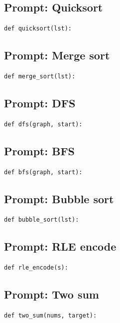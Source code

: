
\subsection{Prompt: Quicksort}
\label{sec:appendix_quicksort}

\begin{verbatim}
def quicksort(lst):
\end{verbatim}


\subsection{Prompt: Merge sort}
\label{sec:appendix_merge_sort}

\begin{verbatim}
def merge_sort(lst):
\end{verbatim}


\subsection{Prompt: DFS}
\label{sec:appendix_dfs}

\begin{verbatim}
def dfs(graph, start):
\end{verbatim}


\subsection{Prompt: BFS}
\label{sec:appendix_bfs}

\begin{verbatim}
def bfs(graph, start):
\end{verbatim}


\subsection{Prompt: Bubble sort}
\label{sec:appendix_bubble_sort}

\begin{verbatim}
def bubble_sort(lst):
\end{verbatim}


\subsection{Prompt: RLE encode}
\label{sec:appendix_rle_encode}

\begin{verbatim}
def rle_encode(s):
\end{verbatim}


\subsection{Prompt: Two sum}
\label{sec:appendix_two_sum}

\begin{verbatim}
def two_sum(nums, target):
\end{verbatim}


